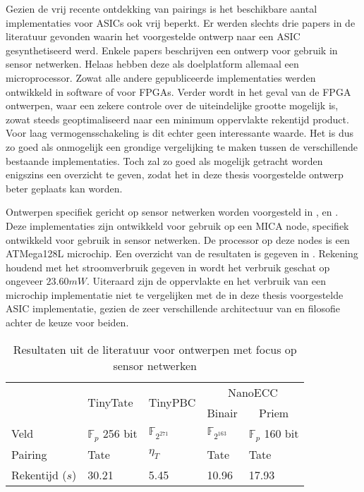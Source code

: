 Gezien de vrij recente ontdekking van pairings is het beschikbare aantal implementaties voor ASICs ook vrij beperkt. Er werden slechts drie papers in de literatuur gevonden waarin het voorgestelde ontwerp naar een ASIC gesynthetiseerd werd. Enkele papers beschrijven een ontwerp voor gebruik in sensor netwerken. Helaas hebben deze als doelplatform allemaal een microprocessor. Zowat alle andere gepubliceerde implementaties werden ontwikkeld in software of voor FPGAs. Verder wordt in het geval van de FPGA ontwerpen, waar een zekere controle over de uiteindelijke grootte mogelijk is, zowat steeds geoptimaliseerd naar een minimum oppervlakte rekentijd product. Voor laag vermogensschakeling is dit echter geen interessante waarde. Het is dus zo goed als onmogelijk een grondige vergelijking te maken tussen de verschillende bestaande implementaties. Toch zal zo goed als mogelijk getracht worden enigszins een overzicht te geven, zodat het in deze thesis voorgestelde ontwerp beter geplaats kan worden.

Ontwerpen specifiek gericht op sensor netwerken worden voorgesteld in \cite{tinytate}, \cite{tinypbc} en \cite{nanoecc}. Deze implementaties zijn ontwikkeld voor gebruik op een MICA node, specifiek ontwikkeld voor gebruik in sensor netwerken. De processor op deze nodes is een ATMega128L microchip. Een overzicht van de resultaten is gegeven in . Rekening houdend met het stroomverbruik gegeven in \cite{nanoecc} wordt het verbruik geschat op ongeveer $23.60mW$. Uiteraard zijn de oppervlakte en het verbruik van een microchip implementatie niet te vergelijken met de in deze thesis voorgestelde ASIC implementatie, gezien de zeer verschillende architectuur van en filosofie achter de keuze voor beiden.

\begin{table}[h]
	\caption{Resultaten uit de literatuur voor ontwerpen met focus op sensor netwerken}
	\label{tabel-resultaten-sensor}

	\centering
	\begin{tabular}{lllll}
		\toprule
		& \multirow{2}{*}{TinyTate \cite{tinytate}}	& \multirow{2}{*}{TinyPBC \cite{tinypbc}} &	\multicolumn{2}{c}{NanoECC \cite{nanoecc}}\\
		\cmidrule{4-5}
		& & & \multicolumn{1}{c}{Binair} & \multicolumn{1}{c}{Priem}\\
			\midrule
		Veld					& $\mathbb{F}_{p}$ 256 bit	& $\mathbb{F}_{2^{271}}$	& $\mathbb{F}_{2^{163}}$	& $\mathbb{F}_{p}$ 160 bit\\
		Pairing				& Tate							& $\eta_T$ 						& Tate							& Tate\\
		Rekentijd ($s$)	& 30.21							& 5.45							& 10.96							& 17.93\\
		\bottomrule
	\end{tabular}
\end{table}

